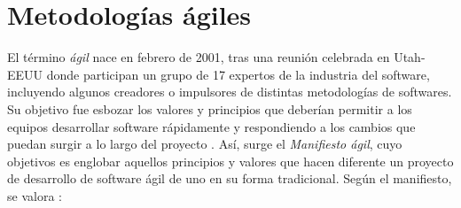 \section{Metodologías ágiles}

El término \textit{ágil} nace en febrero de 2001, tras una reunión celebrada en Utah-EEUU donde participan un grupo de 17 expertos de la industria del software, incluyendo algunos creadores o impulsores de distintas metodologías de softwares. Su objetivo fue esbozar los valores y principios que deberían permitir a los equipos desarrollar software rápidamente y respondiendo a los cambios que puedan surgir a lo largo del proyecto \citep{canos2012}. Así, surge el \textit{Manifiesto ágil}, cuyo objetivos es englobar aquellos principios y valores que hacen diferente un proyecto de desarrollo de software ágil de uno en su forma tradicional. Según el manifiesto, se valora \citep{canos2012}:

